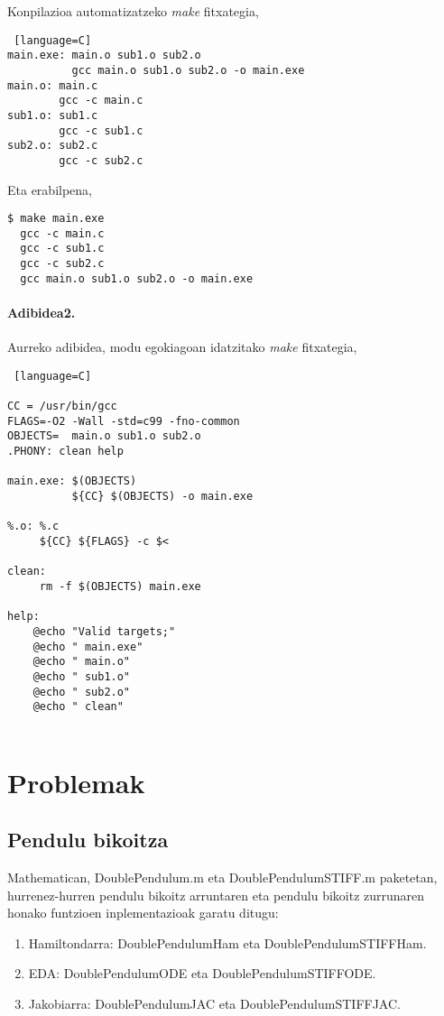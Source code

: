 Konpilazioa automatizatzeko \emph{make} fitxategia,

\begin{lstlisting} [language=C]
main.exe: main.o sub1.o sub2.o
	      gcc main.o sub1.o sub2.o -o main.exe
main.o: main.c
        gcc -c main.c
sub1.o: sub1.c
        gcc -c sub1.c        
sub2.o: sub2.c
        gcc -c sub2.c        
\end{lstlisting}

Eta erabilpena,

\begin{lstlisting}
$ make main.exe
  gcc -c main.c
  gcc -c sub1.c
  gcc -c sub2.c
  gcc main.o sub1.o sub2.o -o main.exe
\end{lstlisting} 

\paragraph*{Adibidea2.} 
Aurreko adibidea, modu egokiagoan idatzitako \emph{make} fitxategia,

\begin{lstlisting} [language=C]

CC = /usr/bin/gcc
FLAGS=-O2 -Wall -std=c99 -fno-common 
OBJECTS=  main.o sub1.o sub2.o
.PHONY: clean help

main.exe: $(OBJECTS)
	      ${CC} $(OBJECTS) -o main.exe
	      
%.o: %.c
     ${CC} ${FLAGS} -c $<	      
	      
clean:
     rm -f $(OBJECTS) main.exe

help:
    @echo "Valid targets;"
    @echo " main.exe"
    @echo " main.o"
    @echo " sub1.o"
    @echo " sub2.o"
    @echo " clean"
             
\end{lstlisting}



\section{Problemak}

\subsection*{Pendulu bikoitza}

Mathematican,  DoublePendulum.m eta DoublePendulumSTIFF.m paketetan, hurrenez-hurren pendulu bikoitz arruntaren eta pendulu bikoitz zurrunaren honako funtzioen inplementazioak garatu ditugu:
\begin{enumerate}
   \item Hamiltondarra: DoublePendulumHam eta DoublePendulumSTIFFHam.
   \item EDA: DoublePendulumODE eta DoublePendulumSTIFFODE.
   \item Jakobiarra: DoublePendulumJAC eta DoublePendulumSTIFFJAC.
\end{enumerate}


